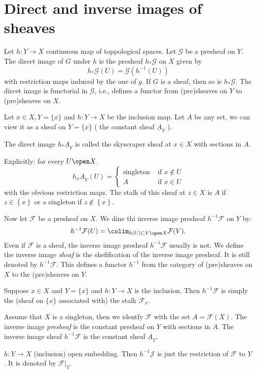 \section{Direct and inverse images of sheaves} \label{sec:direct_and_inverse_images_of_sheaves}
Let $h: Y \to X$ continuous map of toppological spaces.
Let  $\mathcal{G} $ be a presheaf on $Y$.
The direct image of $G$ under $h$ is the presheaf $h_*\mathcal{G} $  on $X$ given by  \[
	h_*\mathcal{G} \left(U \right)  = \mathcal{G} (h^{-1}(U))
\] 
with restriction maps induced by the one of $g$.
If $G$ is a sheaf, then so is $h_* \mathcal{G} $.
The dircet image is functorial in $\mathcal{G} $, i.e., defines a functor from (pre)sheaves on $Y$ to (pre)sheaves on $X$.

\begin{example}
	Let $x \in X, Y = \{ x\} $ and $h: Y \to X$ be the inclusion map. 
	Let $A$ be any set, we can view it as a sheaf on $Y = \{x\} $ ( the constant sheaf $\underline A _Y$ ).

	The direct image $h_* \underline A_Y$ is called the skyscraper sheaf at $x \in X$ with sections in $A$.

	Explicitly: for every $U \open X$. \[
		h_x\underline A_Y (U) = \begin{cases}
			\text{singleton} & \text{ if } x \not\in U \\
			A & \text{ if } x \in U
		\end{cases}
	\]
	with the obvious restriction maps.
	The stalk of this sheaf at $z \in X$ is $A$ if $z \in \overline{\left\{ x \right\} }$ or a singleton if $z \not\in  \overline{\left\{ x \right\} }$.
\end{example}

Now let $\mathcal{F} $ be a presheaf on $X$. We dine thi inverse image presheaf $h^{-1} \mathcal{F} $ on $Y$ by: \[
	h^{-1}\mathcal{F} (U) = \colim_{h(U) \subset V \open X} \mathcal{F} (V)
.\] 
Even if $\mathcal{F}$ is a sheaf, the inverse image presheaf $h^{-1} \mathcal{F} $ usually is not.
We define the inverse image \emph{sheaf} is the shefification of the inverse image presheaf. It is still denoted by $h^{-1} \mathcal{F} $.  
This defines a functor $h^{-1}$ from the category of (pre)sheaves on $ X$ to the (pre)sheaves on $Y$.

\begin{example}
	Suppose $x \in X$ and $Y = \{x\} $ and $h:Y \to X$ is the inclusion. Then $h^{-1} \mathcal{F} $ is simply the (sheaf on $\{x\} $ associated with) the stalk $\mathcal{F} _x$. 
\end{example}
\begin{example}
	Assume that $X$ is a singleton, then we identfy $\mathcal{F} $ with the set $A = \mathcal{F} (X)$. The inverse image \emph{presheaf} is the constant presheaf on $Y$ with sections in $A$.
	The inverse image sheaf $h^{-1}\mathcal{F} $ is the constant sheaf $\underline A_Y$. 
\end{example}
\begin{example}
	$h: Y \to X$ (inclusion) open embedding. Then  $h^{-1}\mathcal{J} $ is just the restriction of $\mathcal{F}$ to $Y$. It is denoted by $\mathcal{F} |_Y$. 
\end{example}

